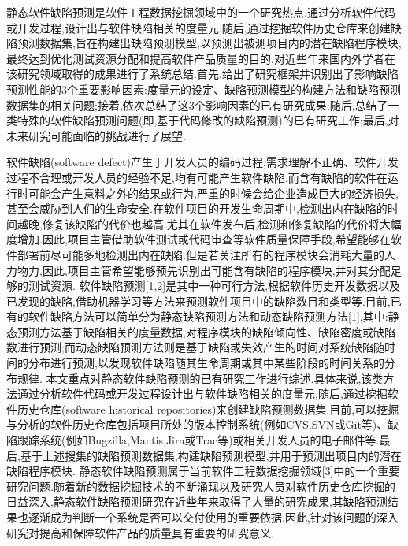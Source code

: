 \documentclass{rjthesis}
\begin{document}
	
	\rjmaketitle
	\begin{rjabstract}
		静态软件缺陷预测是软件工程数据挖掘领域中的一个研究热点.通过分析软件代码或开发过程,设计出与软件缺陷相关的度量元;随后,通过挖掘软件历史仓库来创建缺陷预测数据集,旨在构建出缺陷预测模型,以预测出被测项目内的潜在缺陷程序模块,最终达到优化测试资源分配和提高软件产品质量的目的.对近些年来国内外学者在该研究领域取得的成果进行了系统总结.首先,给出了研究框架并识别出了影响缺陷预测性能的3个重要影响因素:度量元的设定、缺陷预测模型的构建方法和缺陷预测数据集的相关问题;接着,依次总结了这3个影响因素的已有研究成果;随后,总结了一类特殊的软件缺陷预测问题(即,基于代码修改的缺陷预测)的已有研究工作;最后,对未来研究可能面临的挑战进行了展望.
	\end{rjabstract}
	
	软件缺陷(software defect)产生于开发人员的编码过程,需求理解不正确、软件开发过程不合理或开发人员的经验不足,均有可能产生软件缺陷.而含有缺陷的软件在运行时可能会产生意料之外的结果或行为,严重的时候会给企业造成巨大的经济损失,甚至会威胁到人们的生命安全.在软件项目的开发生命周期中,检测出内在缺陷的时间越晚,修复该缺陷的代价也越高.尤其在软件发布后,检测和修复缺陷的代价将大幅度增加.因此,项目主管借助软件测试或代码审查等软件质量保障手段,希望能够在软件部署前尽可能多地检测出内在缺陷.但是若关注所有的程序模块会消耗大量的人力物力,因此,项目主管希望能够预先识别出可能含有缺陷的程序模块,并对其分配足够的测试资源.
	软件缺陷预测[1,2]是其中一种可行方法,根据软件历史开发数据以及已发现的缺陷,借助机器学习等方法来预测软件项目中的缺陷数目和类型等.目前,已有的软件缺陷方法可以简单分为静态缺陷预测方法和动态缺陷预测方法[1],其中:静态预测方法基于缺陷相关的度量数据,对程序模块的缺陷倾向性、缺陷密度或缺陷数进行预测;而动态缺陷预测方法则是基于缺陷或失效产生的时间对系统缺陷随时间的分布进行预测,以发现软件缺陷随其生命周期或其中某些阶段的时间关系的分布规律.
	本文重点对静态软件缺陷预测的已有研究工作进行综述.具体来说,该类方法通过分析软件代码或开发过程设计出与软件缺陷相关的度量元,随后,通过挖掘软件历史仓库(software historical repositories)来创建缺陷预测数据集.目前,可以挖掘与分析的软件历史仓库包括项目所处的版本控制系统(例如CVS,SVN或Git等)、缺陷跟踪系统(例如Bugzilla,Mantis,Jira或Trac等)或相关开发人员的电子邮件等.最后,基于上述搜集的缺陷预测数据集,构建缺陷预测模型,并用于预测出项目内的潜在缺陷程序模块.
	静态软件缺陷预测属于当前软件工程数据挖掘领域[3]中的一个重要研究问题.随着新的数据挖掘技术的不断涌现以及研究人员对软件历史仓库挖掘的日益深入,静态软件缺陷预测研究在近些年来取得了大量的研究成果,其缺陷预测结果也逐渐成为判断一个系统是否可以交付使用的重要依据.因此,针对该问题的深入研究对提高和保障软件产品的质量具有重要的研究意义.
\end{document}
